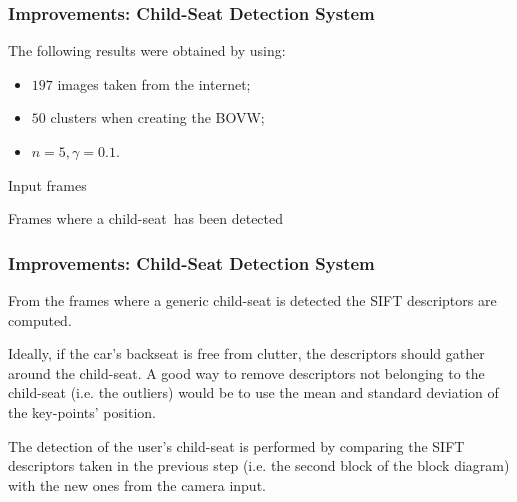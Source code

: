 \documentclass{beamer}
\begin{document}
	\begin{frame}
		\frametitle{Improvements: Child-Seat Detection System}
		The following results were obtained by using:
		\begin{itemize}
			\item $197$ images taken from the internet;
			\item $50$ clusters when creating the BOVW;
			\item $n=5, \gamma=0.1$.
		\end{itemize}
		
		\bigskip
		
		\begin{minipage}{0.5\textwidth}
			\begin{center}
				{\small Input frames}
			\end{center}
		\end{minipage}%
		\begin{minipage}{0.5\textwidth}
			\begin{center}
				\begin{small}
					Frames where a child-seat\
					has been detected
				\end{small}
			\end{center}
		\end{minipage}
	
		\bigskip
		
	\end{frame}

	\begin{frame}
		\frametitle{Improvements: Child-Seat Detection System}
		From the frames where a generic child-seat is detected the SIFT descriptors are computed.
		
		\bigskip
		
		Ideally, if the car's backseat is free from clutter, the descriptors should gather around the child-seat. A good way to remove descriptors not belonging to the child-seat (i.e. the outliers) would be to use the mean and standard deviation of the key-points' position.
		
		\bigskip
		
		The detection of the user's child-seat is performed by comparing the SIFT descriptors taken in the previous step (i.e. the second block of the block diagram) with the new ones from the camera input.
	\end{frame}
\end{document}
